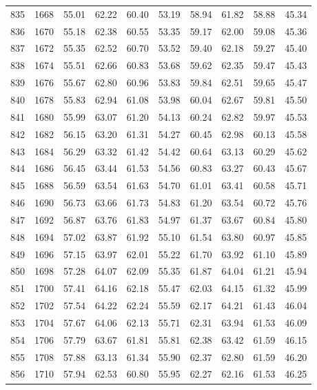 \begin{longtable}{rrllllllll}
		835 & 1668 & 55.01 & 62.22 & 60.40 & 53.19 & 58.94 & 61.82 & 58.88 & 45.34 \\ 
		836 & 1670 & 55.18 & 62.38 & 60.55 & 53.35 & 59.17 & 62.00 & 59.08 & 45.36 \\ 
		837 & 1672 & 55.35 & 62.52 & 60.70 & 53.52 & 59.40 & 62.18 & 59.27 & 45.40 \\ 
		838 & 1674 & 55.51 & 62.66 & 60.83 & 53.68 & 59.62 & 62.35 & 59.47 & 45.43 \\ 
		839 & 1676 & 55.67 & 62.80 & 60.96 & 53.83 & 59.84 & 62.51 & 59.65 & 45.47 \\ 
		840 & 1678 & 55.83 & 62.94 & 61.08 & 53.98 & 60.04 & 62.67 & 59.81 & 45.50 \\ 
		841 & 1680 & 55.99 & 63.07 & 61.20 & 54.13 & 60.24 & 62.82 & 59.97 & 45.53 \\ 
		842 & 1682 & 56.15 & 63.20 & 61.31 & 54.27 & 60.45 & 62.98 & 60.13 & 45.58 \\ 
		843 & 1684 & 56.29 & 63.32 & 61.42 & 54.42 & 60.64 & 63.13 & 60.29 & 45.62 \\ 
		844 & 1686 & 56.45 & 63.44 & 61.53 & 54.56 & 60.83 & 63.27 & 60.43 & 45.67 \\ 
		845 & 1688 & 56.59 & 63.54 & 61.63 & 54.70 & 61.01 & 63.41 & 60.58 & 45.71 \\ 
		846 & 1690 & 56.73 & 63.66 & 61.73 & 54.83 & 61.20 & 63.54 & 60.72 & 45.76 \\ 
		847 & 1692 & 56.87 & 63.76 & 61.83 & 54.97 & 61.37 & 63.67 & 60.84 & 45.80 \\ 
		848 & 1694 & 57.02 & 63.87 & 61.92 & 55.10 & 61.54 & 63.80 & 60.97 & 45.85 \\ 
		849 & 1696 & 57.15 & 63.97 & 62.01 & 55.22 & 61.70 & 63.92 & 61.10 & 45.89 \\ 
		850 & 1698 & 57.28 & 64.07 & 62.09 & 55.35 & 61.87 & 64.04 & 61.21 & 45.94 \\ 
		851 & 1700 & 57.41 & 64.16 & 62.18 & 55.47 & 62.03 & 64.15 & 61.32 & 45.99 \\ 
		852 & 1702 & 57.54 & 64.22 & 62.24 & 55.59 & 62.17 & 64.21 & 61.43 & 46.04 \\ 
		853 & 1704 & 57.67 & 64.06 & 62.13 & 55.71 & 62.31 & 63.94 & 61.53 & 46.09 \\ 
		854 & 1706 & 57.79 & 63.67 & 61.81 & 55.81 & 62.38 & 63.42 & 61.59 & 46.15 \\ 
		855 & 1708 & 57.88 & 63.13 & 61.34 & 55.90 & 62.37 & 62.80 & 61.59 & 46.20 \\ 
		856 & 1710 & 57.94 & 62.53 & 60.80 & 55.95 & 62.27 & 62.16 & 61.53 & 46.25 \\ 

\end{longtable}
